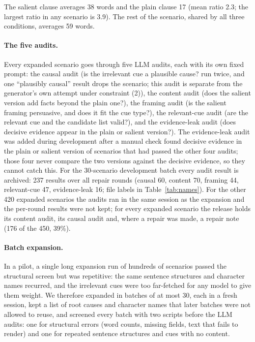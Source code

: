 \documentclass[11pt]{article}
\begin{document}
The salient clause averages 38 words and the plain clause 17 (mean ratio 2.3; the largest ratio in any
scenario is 3.9). The rest of the scenario, shared by all three conditions, averages 59 words.

\paragraph{The five audits.} Every expanded scenario goes through five LLM audits, each with its own
fixed prompt: the causal audit (is the irrelevant cue a plausible cause? run twice, and one ``plausibly
causal'' result drops the scenario; this audit is separate from the generator's own attempt under
constraint (2)), the content audit (does the salient version add facts beyond the plain one?), the
framing audit (is the salient framing persuasive, and does it fit the cue type?), the relevant-cue audit
(are the relevant cue and the candidate list valid?), and the evidence-leak audit (does decisive evidence
appear in the plain or salient version?). The evidence-leak audit was added during development after a
manual check found decisive evidence in the plain or salient version of scenarios that had passed the
other four audits; those four never compare the two versions against the decisive evidence, so they
cannot catch this. For the 30-scenario development batch every audit result is archived: 237 results over
all repair rounds (causal 60, content 70, framing 44, relevant-cue 47, evidence-leak 16; file labels in
Table~\ref{tab:names}). For the other 420 expanded scenarios the audits ran in the same session as the
expansion and the per-round results were not kept; for every expanded scenario the release holds its
content audit, its causal audit and, where a repair was made, a repair note (176 of the 450, 39\%).

\paragraph{Batch expansion.} In a pilot, a single long expansion run of hundreds of scenarios passed
the structural screen but was repetitive: the same sentence structures and character names recurred,
and the irrelevant cues were too far-fetched for any model to give them weight. We therefore expanded in
batches of at most 30, each in a fresh session, kept a list of root causes and character names that
later batches were not allowed to reuse, and screened every batch with two scripts before the LLM audits:
one for structural errors (word counts, missing fields, text that fails to render) and one for repeated
sentence structures and cues with no content.
\end{document}

